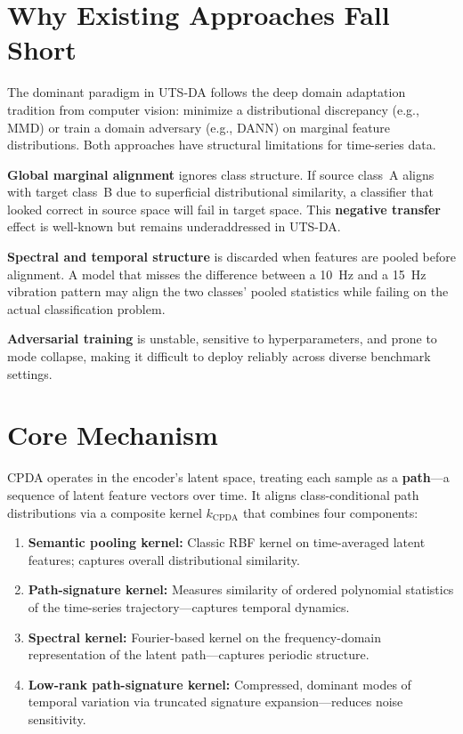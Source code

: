 \documentclass[10pt,twocolumn]{article}
\begin{document}
\section{Why Existing Approaches Fall Short}

The dominant paradigm in UTS-DA follows the deep domain adaptation tradition from
computer vision: minimize a distributional discrepancy (e.g., MMD) or train a domain
adversary (e.g., DANN) on marginal feature distributions. Both approaches have
structural limitations for time-series data.

\textbf{Global marginal alignment} ignores class structure. If source class~A
aligns with target class~B due to superficial distributional similarity, a classifier
that looked correct in source space will fail in target space. This \textbf{negative
transfer} effect is well-known but remains underaddressed in UTS-DA.

\textbf{Spectral and temporal structure} is discarded when features are pooled
before alignment. A model that misses the difference between a 10~Hz and a 15~Hz
vibration pattern may align the two classes' pooled statistics while failing on
the actual classification problem.

\textbf{Adversarial training} is unstable, sensitive to hyperparameters, and prone
to mode collapse, making it difficult to deploy reliably across diverse benchmark
settings.

\section{Core Mechanism}

CPDA operates in the encoder's latent space, treating each sample as a
\textbf{path}---a sequence of latent feature vectors over time. It aligns
class-conditional path distributions via a composite kernel $k_{\mathrm{CPDA}}$
that combines four components:

\begin{enumerate}[itemsep=2pt,parsep=0pt]
  \item \textbf{Semantic pooling kernel:} Classic RBF kernel on time-averaged
    latent features; captures overall distributional similarity.
  \item \textbf{Path-signature kernel:} Measures similarity of ordered polynomial
    statistics of the time-series trajectory---captures temporal dynamics.
  \item \textbf{Spectral kernel:} Fourier-based kernel on the frequency-domain
    representation of the latent path---captures periodic structure.
  \item \textbf{Low-rank path-signature kernel:} Compressed, dominant modes of
    temporal variation via truncated signature expansion---reduces noise sensitivity.
\end{enumerate}
\end{document}

